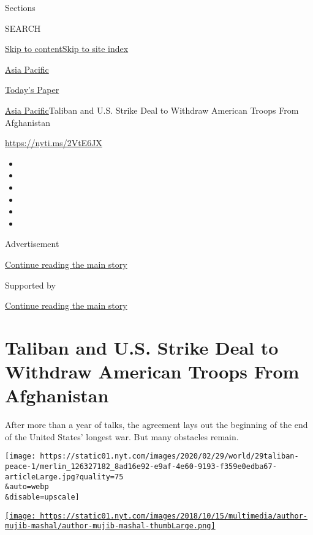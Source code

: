 Sections

SEARCH

\protect\hyperlink{site-content}{Skip to
content}\protect\hyperlink{site-index}{Skip to site index}

\href{https://www.nytimes.com/section/world/asia}{Asia Pacific}

\href{https://myaccount.nytimes.com/auth/login?response_type=cookie\&client_id=vi}{}

\href{https://www.nytimes.com/section/todayspaper}{Today's Paper}

\href{/section/world/asia}{Asia Pacific}\textbar{}Taliban and U.S.
Strike Deal to Withdraw American Troops From Afghanistan

\url{https://nyti.ms/2VtE6JX}

\begin{itemize}
\item
\item
\item
\item
\item
\item
\end{itemize}

Advertisement

\protect\hyperlink{after-top}{Continue reading the main story}

Supported by

\protect\hyperlink{after-sponsor}{Continue reading the main story}

\hypertarget{taliban-and-us-strike-deal-to-withdraw-american-troops-from-afghanistan}{%
\section{Taliban and U.S. Strike Deal to Withdraw American Troops From
Afghanistan}\label{taliban-and-us-strike-deal-to-withdraw-american-troops-from-afghanistan}}

After more than a year of talks, the agreement lays out the beginning of
the end of the United States' longest war. But many obstacles remain.

\texttt{[image: https://static01.nyt.com/images/2020/02/29/world/29taliban-peace-1/merlin\_126327182\_8ad16e92-e9af-4e60-9193-f359e0edba67-articleLarge.jpg?quality=75\\\&auto=webp\\\&disable=upscale]}

\href{https://www.nytimes.com/by/mujib-mashal}{\texttt{[image: https://static01.nyt.com/images/2018/10/15/multimedia/author-mujib-mashal/author-mujib-mashal-thumbLarge.png]}}

